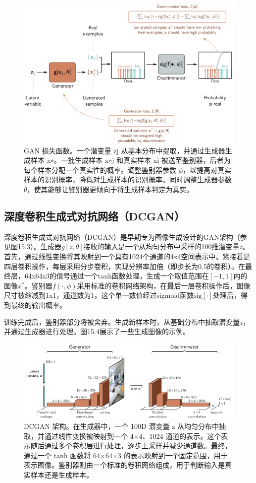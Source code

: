 \begin{figure}[ht!]
\centering
\includegraphics[width=0.7\linewidth]{png/chapter15/GanDiscrimGen.png}
\caption{GAN 损失函数。一个潜变量 zj 从基本分布中提取，并通过生成器生成样本 x∗。一批生成样本 {x∗j } 和真实样本 {xi} 被送至鉴别器，后者为每个样本分配一个真实性的概率。调整鉴别器参数 \(\phi\)，以提高对真实样本的识别概率，降低对生成样本的识别概率。同时调整生成器参数 \(\theta\)，使其能够让鉴别器更倾向于将生成样本判定为真实。}
\end{figure}


\subsection{深度卷积生成式对抗网络（DCGAN）}
深度卷积生成式对抗网络（DCGAN）是早期专为图像生成设计的GAN架构（参见图15.3）。生成器\(g[z, \theta]\)接收的输入是一个从均匀分布中采样的100维潜变量\(z\)。首先，通过线性变换将其映射到一个具有1024个通道的4x4空间表示中。紧接着是四层卷积操作，每层采用分步卷积，实现分辨率加倍（即步长为0.5的卷积）。在最终层，64x64x3的信号通过一个tanh函数处理，生成一个取值范围在\([-1, 1]\)内的图像\(x^*\)。鉴别器\(f(\cdot, \phi)\)采用标准的卷积网络架构，在最后一层卷积操作后，图像尺寸被缩减到1x1，通道数为1。这个单一数值经过sigmoid函数\(\text{sig}[\cdot]\)处理后，得到最终的输出概率。

训练完成后，鉴别器部分将被舍弃。生成新样本时，从基础分布中抽取潜变量\(z\)，并通过生成器进行处理。图15.4展示了一些生成图像的示例。

\begin{figure}[ht!]
\centering
\includegraphics[width=0.7\linewidth]{png/chapter15/GanDCGANArch.png}
\caption{DCGAN 架构。在生成器中，一个 100D 潜变量 z 从均匀分布中抽取，并通过线性变换被映射到一个 4×4、1024 通道的表示。这个表示随后通过多个卷积层进行处理，逐步上采样并减少通道数。最终，通过一个 tanh 函数将 64×64×3 的表示映射到一个固定范围，用于表示图像。鉴别器则由一个标准的卷积网络组成，用于判断输入是真实样本还是生成样本。}
\end{figure}


